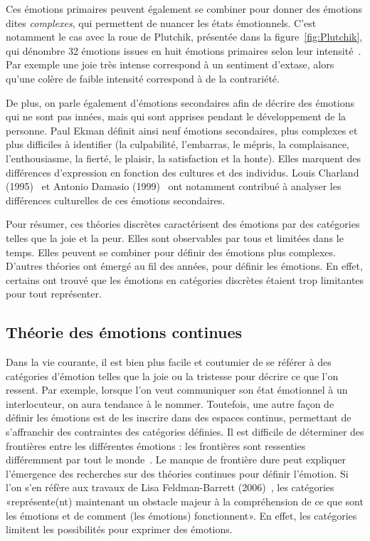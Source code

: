 

Ces émotions primaires peuvent également se combiner pour donner des émotions dites \textit{complexes}, qui permettent de nuancer les états émotionnels. C'est notamment le cas avec la roue de Plutchik, présentée dans la figure~\ref{fig:Plutchik}, qui dénombre 32 émotions issues en huit émotions primaires selon leur intensité~\cite{Plutchik1980}. Par exemple une joie très intense correspond à un sentiment d'extase, alors qu'une colère de faible intensité correspond à de la contrariété.

De plus, on parle également d'émotions secondaires afin de décrire des émotions qui ne sont pas innées, mais qui sont apprises pendant le développement de la personne. Paul Ekman définit ainsi neuf émotions secondaires, plus complexes et plus difficiles à identifier (la culpabilité, l'embarras, le mépris, la complaisance, l'enthousiasme, la fierté, le plaisir, la satisfaction et la honte). Elles marquent des différences d'expression en fonction des cultures et des individus. Louis Charland (1995)~\cite{Charland1995} et Antonio Damasio (1999)~\cite{Damasio1999} ont notamment contribué à analyser les différences culturelles de ces émotions secondaires.

Pour résumer, ces théories discrètes caractérisent des émotions par des catégories telles que la joie et la peur. Elles sont observables par tous et limitées dans le temps. Elles peuvent se combiner pour définir des émotions plus complexes.
D'autres théories ont émergé au fil des années, pour définir les émotions. En effet, certains ont trouvé que les émotions en catégories discrètes étaient trop limitantes pour tout représenter. %


\subsection{Théorie des émotions continues}
Dans la vie courante, il est bien plus facile et coutumier de se référer à des catégories d'émotion telles que la joie ou la tristesse pour décrire ce que l'on ressent. Par exemple, lorsque l'on veut communiquer son état émotionnel à un interlocuteur, on aura tendance à le nommer. Toutefois, une autre façon de définir les émotions est de les inscrire dans des espaces continus, permettant de s'affranchir des contraintes des catégories définies. Il est difficile de déterminer des frontières entre les différentes émotions : les frontières sont ressenties différemment par tout le monde~\cite{Busso2012}. Le manque de frontière dure peut expliquer l'émergence des recherches sur des théories continues pour définir l'émotion. Si l'on s'en réfère aux travaux de Lisa Feldman-Barrett (2006)~\cite{Feldman2006}, les catégories «représente(nt) maintenant un obstacle majeur à la compréhension de ce que sont les émotions et de comment (les émotions) fonctionnent». En effet, les catégories limitent les possibilités pour exprimer des émotions.

